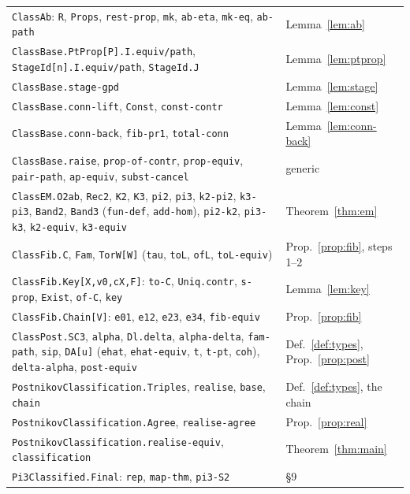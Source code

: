 \documentclass[11pt]{amsart}
\theoremstyle{definition}
\theoremstyle{remark}
\newcommand{\code}[1]{\texttt{#1}}
\begin{document}
\begin{longtable}{p{}p{}}
\code{ClassAb}: \code{R}, \code{Props}, \code{rest-prop}, \code{mk}, \code{ab-eta}, \code{mk-eq}, \code{ab-path} & Lemma~\ref{lem:ab} \\
\code{ClassBase.PtProp[P].I.equiv/path}, \code{StageId[n].I.equiv/path}, \code{StageId.J} & Lemma~\ref{lem:ptprop} \\
\code{ClassBase.stage-gpd} & Lemma~\ref{lem:stage} \\
\code{ClassBase.conn-lift}, \code{Const}, \code{const-contr} & Lemma~\ref{lem:const} \\
\code{ClassBase.conn-back}, \code{fib-pr1}, \code{total-conn} & Lemma~\ref{lem:conn-back} \\
\code{ClassBase.raise}, \code{prop-of-contr}, \code{prop-equiv}, \code{pair-path}, \code{ap-equiv}, \code{subst-cancel} & generic \\
\code{ClassEM.O2ab}, \code{Rec2}, \code{K2}, \code{K3}, \code{pi2}, \code{pi3}, \code{k2-pi2}, \code{k3-pi3},
\code{Band2}, \code{Band3} (\code{fun-def}, \code{add-hom}), \code{pi2-k2}, \code{pi3-k3}, \code{k2-equiv}, \code{k3-equiv} & Theorem~\ref{thm:em} \\
\code{ClassFib.C}, \code{Fam}, \code{TorW[W]} (\code{tau}, \code{toL}, \code{ofL}, \code{toL-equiv}) & Prop.~\ref{prop:fib}, steps 1--2 \\
\code{ClassFib.Key[X,v0,cX,F]}: \code{to-C}, \code{Uniq.contr}, \code{s-prop}, \code{Exist}, \code{of-C}, \code{key} & Lemma~\ref{lem:key} \\
\code{ClassFib.Chain[V]}: \code{e01}, \code{e12}, \code{e23}, \code{e34}, \code{fib-equiv} & Prop.~\ref{prop:fib} \\
\code{ClassPost.SC3}, \code{alpha}, \code{Dl.delta}, \code{alpha-delta}, \code{fam-path}, \code{sip},
\code{DA[u]} (\code{ehat}, \code{ehat-equiv}, \code{t}, \code{t-pt}, \code{coh}), \code{delta-alpha}, \code{post-equiv} & Def.~\ref{def:types}, Prop.~\ref{prop:post} \\
\code{PostnikovClassification.Triples}, \code{realise}, \code{base}, \code{chain} & Def.~\ref{def:types}, the chain \\
\code{PostnikovClassification.Agree}, \code{realise-agree} & Prop.~\ref{prop:real} \\
\code{PostnikovClassification.realise-equiv}, \code{classification} & Theorem~\ref{thm:main} \\
\code{Pi3Classified.Final}: \code{rep}, \code{map-thm}, \code{pi3-S2} & \S9 \\
\end{longtable}
\end{document}
